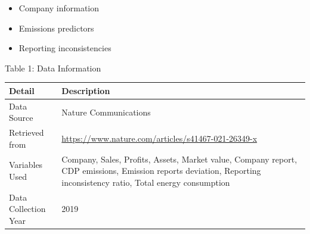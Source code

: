 \documentclass[
  12pt,
]{article}
\providecommand{\tightlist}{%
  \setlength{\itemsep}{0pt}\setlength{\parskip}{0pt}}
\begin{document}
\begin{itemize}
\tightlist
\item
  Company information
\item
  Emissions predictors
\item
  Reporting inconsistencies
\end{itemize}

Table 1: Data Information

\begin{longtable}[]{@{}ll@{}}
\toprule
\begin{minipage}[b]{0.58\columnwidth}\raggedright
\textbf{Detail}\strut
\end{minipage} & \begin{minipage}[b]{0.36\columnwidth}\raggedright
\textbf{Description}\strut
\end{minipage}\tabularnewline
\midrule
\endhead
\begin{minipage}[t]{0.58\columnwidth}\raggedright
Data Source\strut
\end{minipage} & \begin{minipage}[t]{0.36\columnwidth}\raggedright
Nature Communications\strut
\end{minipage}\tabularnewline
\begin{minipage}[t]{0.58\columnwidth}\raggedright
Retrieved from\strut
\end{minipage} & \begin{minipage}[t]{0.36\columnwidth}\raggedright
\url{https://www.nature.com/articles/s41467-021-26349-x}\strut
\end{minipage}\tabularnewline
\begin{minipage}[t]{0.58\columnwidth}\raggedright
Variables Used\strut
\end{minipage} & \begin{minipage}[t]{0.36\columnwidth}\raggedright
Company, Sales, Profits, Assets, Market value, Company report, CDP
emissions, Emission reports deviation, Reporting inconsistency ratio,
Total energy consumption\strut
\end{minipage}\tabularnewline
\begin{minipage}[t]{0.58\columnwidth}\raggedright
Data Collection Year\strut
\end{minipage} & \begin{minipage}[t]{0.36\columnwidth}\raggedright
2019\strut
\end{minipage}\tabularnewline
\bottomrule
\end{longtable}

\newpage
\end{document}
